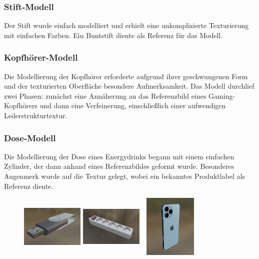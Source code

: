 \subsubsection*{Stift-Modell}
Der Stift wurde einfach modelliert und erhielt eine unkomplizierte Texturierung mit einfachen Farben. Ein Buntstift diente als Referenz für das Modell.

\subsubsection*{Kopfhörer-Modell}
Die Modellierung der Kopfhörer erforderte aufgrund ihrer geschwungenen Form und der texturierten Oberfläche besondere Aufmerksamkeit. Das Modell durchlief zwei Phasen: zunächst eine Annäherung an das Referenzbild eines Gaming-Kopfhörers und dann eine Verfeinerung, einschließlich einer aufwendigen Lederstrukturtextur.

\subsubsection*{Dose-Modell}
Die Modellierung der Dose eines Energydrinks begann mit einem einfachen Zylinder, der dann anhand eines Referenzbildes geformt wurde. Besonderes Augenmerk wurde auf die Textur gelegt, wobei ein bekanntes Produktlabel als Referenz diente.

\newpage
\begin{figure}[H]
    \centering
    \begin{minipage}[b]{0.20\textwidth}
        \centering
        \includegraphics[width=3cm,height=3cm]{images/usb.png}
    \end{minipage}
    \hfill
    \begin{minipage}[b]{0.20\textwidth}
        \centering
        \includegraphics[width=3cm,height=3cm]{images/stromverteiler.png}
    \end{minipage}
    \hfill
    \begin{minipage}[b]{0.20\textwidth}
        \centering
        \includegraphics[width=3cm,height=3cm]{images/iphone.png}
    \end{minipage}
\end{figure}

